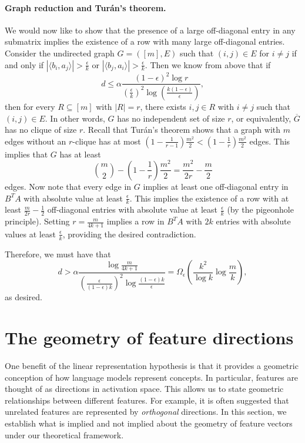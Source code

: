 \documentclass[11pt]{article}
\begin{document}
\paragraph{Graph reduction and Tur\'an's theorem.} We would now like to show that the presence of a large off-diagonal entry in any submatrix implies the existence of a row with many large off-diagonal entries. Consider the undirected graph $G = ([m],E)$ such that $(i,j)\in E$ for $i\neq j$ if and only if $|\langle b_i, a_j \rangle| > \frac{\epsilon}{k}$ or $|\langle b_j, a_i \rangle| > \frac{\epsilon}{k}$. Then we know from above that if
\begin{equation}
    d\le \alpha \frac{(1 - \epsilon)^2\log r}{(\frac{\epsilon}{k})^2\log (\frac{k(1 - \epsilon)}{\epsilon})},
\end{equation}
then for every $R\subseteq [m]$ with $|R|=r$, there exists $i,j\in R$ with $i\neq j$ such that $(i,j)\in E.$ In other words, $G$ has no independent set of size $r$, or equivalently, $\overline{G}$ has no clique of size $r.$ Recall that Tur\'an's theorem shows that a graph with $m$ edges without an $r$-clique has at most $(1 - \frac{1}{r-1})\frac{m^2}{2} < (1 - \frac{1}{r})\frac{m^2}{2}$ edges. This implies that $G$ has at least
\begin{equation}
    \binom{m}{2} - \left(1 - \frac{1}{r}\right)\frac{m^2}{2} = \frac{m^2}{2r}-\frac{m}{2}
\end{equation}
edges. Now note that every edge in $G$ implies at least one off-diagonal entry in $B^TA$ with absolute value at least $\frac{\epsilon}{k}.$ This implies the existence of a row with at least $\frac{m}{2r} - \frac{1}{2}$ off-diagonal entries with absolute value at least $\frac{\epsilon}{k}$ (by the pigeonhole principle). Setting $r = \frac{m}{4k+1}$ implies a row in $B^TA$ with $2k$ entries with absolute values at least $\frac{\epsilon}{k}$, providing the desired contradiction.

Therefore, we must have that
\begin{equation}
    d > \alpha\frac{\log \frac{m}{4k+1}}{(\frac{\epsilon}{(1-\epsilon)k})^2\log \frac{(1-\epsilon)k}{\epsilon}} = \Omega_\epsilon\left(\frac{k^2}{\log k}\log \frac{m}{k}\right),
\end{equation}
as desired.



\section{The geometry of feature directions}\label{sec:feature-geometry}
One benefit of the linear representation hypothesis is that it provides a geometric conception of how language models represent concepts. In particular, features are thought of as directions in activation space. This allows us to state geometric relationships between different features. For example, it is often suggested that unrelated features are represented by \textit{orthogonal} directions. In this section, we establish what is implied and not implied about the geometry of feature vectors under our theoretical framework.
\end{document}
